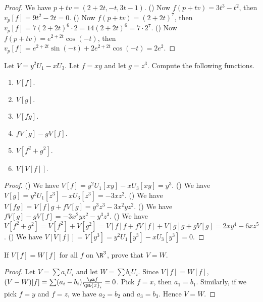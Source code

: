 \begin{proof}
    We have $p+tv=(2+2t,-t,3t-1)$. () Now $f(p+tv)=3{t}^{3}-{t}^{2}$, then ${v}_{p}[f]=9{t}^{2}-2t=0$. () Now $f(p+tv)={(2+2t)}^{7}$, then ${v}_{p}[f]=7{(2+2t)}^{6}\cdot 2=14{(2+2t)}^{6}=7\cdot{2}^{7}$. () Now $f(p+tv)={e}^{2+2t}\cos(-t)$, then ${v}_{p}[f]={e}^{2+2t}\sin(-t)+2{e}^{2+2t}\cos(-t)=2{e}^{2}$.
\end{proof}
\begin{exercise}[1.3.3]
    Let $V={y}^{2}{U}_{1}-x{U}_{3}$. Let $f=xy$ and let $g={z}^{3}$. Compute the following functions.
    \begin{enumerate}
        \item $V[f]$.
        \item $V[g]$.
        \item $V[fg]$.
        \item $fV[g]-gV[f]$.
        \item $V[{f}^{2}+{g}^{2}]$.
        \item $V[V[f]]$.
    \end{enumerate}
\end{exercise}
\begin{proof}
    () We have $V[f]={y}^{2}{U}_{1}[xy]-x{U}_{3}[xy]={y}^{3}$. () We have $V[g]={y}^{2}{U}_{1}[{z}^{3}]-x{U}_{3}[{z}^{3}]=-3x{z}^{2}$. () We have $V[fg]=V[f]g+fV[g]={y}^{3}{z}^{3}-3{x}^{2}y{z}^{2}$. () We have $fV[g]-gV[f]=-3{x}^{2}y{z}^{2}-{y}^{3}{z}^{3}$. () We have $V[{f}^{2}+{g}^{2}]=V[{f}^{2}]+V[{g}^{2}]=V[f]f+fV[f]+V[g]g+gV[g]=2x{y}^{4}-6x{z}^{5}$. () We have $V[V[f]]=V[{y}^{3}]={y}^{2}{U}_{1}[{y}^{3}]-x{U}_{3}[{y}^{3}]=0$.
\end{proof}
\begin{exercise}[1.3.5]
    If $V[f]=W[f]$ for all $f$ on ${\R}^{3}$, prove that $V=W$.
\end{exercise}
\begin{proof}
    Let $V=\sum{a}_{i}{U}_{i}$ and let $W=\sum{b}_{i}{U}_{i}$. Since $V[f]=W[f]$, $(V-W)[f]=\sum({a}_{i}-{b}_{i})\frac{\pa f}{\pa{x}_{i}}=0$. Pick $f=x$, then ${a}_{1}={b}_{1}$. Similarly, if we pick $f=y$ and $f=z$, we have ${a}_{2}={b}_{2}$ and ${a}_{3}={b}_{3}$. Hence $V=W$.
\end{proof}
